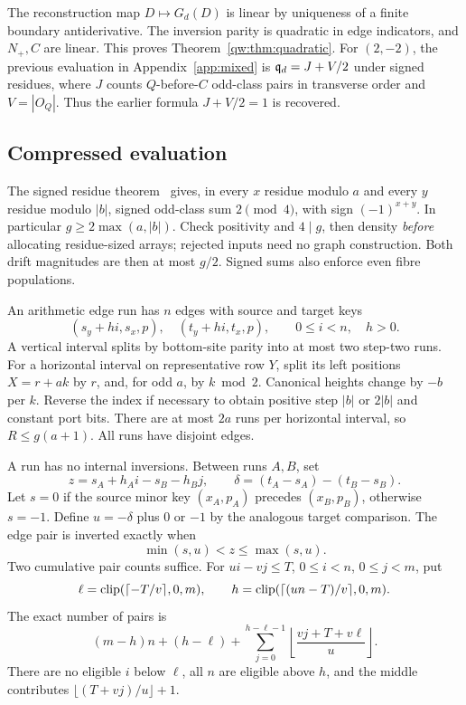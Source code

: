 The reconstruction map $D\mapsto G_d(D)$ is linear by uniqueness of a finite
boundary antiderivative. The inversion parity is quadratic in edge indicators,
and $N_+,C$ are linear. This proves Theorem~\ref{qw:thm:quadratic}.
For $(2,-2)$, the previous evaluation in Appendix~\ref{app:mixed} is
$\mathfrak q_d=J+V/2$ under signed residues, where $J$ counts $Q$-before-$C$ odd-class pairs
in transverse order and $V=|O_Q|$. Thus the earlier formula $J+V/2=1$ is recovered.

\subsection{Compressed evaluation}\label{qw:sec:algorithm}
The signed residue theorem~\cite[Section~7, ``Signed mod-four wake-residue identity'']{Jillhewar2026} gives, in every $x$ residue modulo $a$ and
every $y$ residue modulo $|b|$, signed odd-class sum $2\pmod4$, with sign
$(-1)^{x+y}$. In particular $g\ge2\max(a,|b|)$.
Check positivity and $4\mid g$, then density \emph{before} allocating residue-sized
arrays; rejected inputs need no graph construction. Both drift magnitudes are
then at most $g/2$. Signed sums also enforce even fibre populations.

An arithmetic edge run has $n$ edges with source and target keys
\begin{equation}
 (s_y+hi,s_x,p),\quad (t_y+hi,t_x,p),\qquad 0\le i<n,\quad h>0.
 \label{qw:eq:run}
\end{equation}
A vertical interval splits by bottom-site parity into at most two step-two runs.
For a horizontal interval on representative row $Y$, split its left positions
$X=r+ak$ by $r$, and, for odd $a$, by $k\bmod2$. Canonical heights change by
$-b$ per $k$. Reverse the index if necessary to obtain positive step $|b|$ or
$2|b|$ and constant port bits. There are at most $2a$ runs per horizontal interval,
so $R\le g(a+1)$. All runs have disjoint edges.

A run has no internal inversions. Between runs $A,B$, set
\[
 z=s_A+h_Ai-s_B-h_Bj,\qquad
 \delta=(t_A-s_A)-(t_B-s_B).
\]
Let $s=0$ if the source minor key $(x_A,p_A)$ precedes $(x_B,p_B)$, otherwise
$s=-1$. Define $u=-\delta$ plus $0$ or $-1$ by the analogous target comparison.
The edge pair is inverted exactly when
\begin{equation}
 \min(s,u)<z\le\max(s,u).\label{qw:eq:inversion-range}
\end{equation}
Two cumulative pair counts suffice. For
$ui-vj\le T$, $0\le i<n$, $0\le j<m$, put
\[
 \ell=\operatorname{clip}(\lceil-T/v\rceil,0,m),\qquad
 h=\operatorname{clip}(\lceil(un-T)/v\rceil,0,m).
\]
The exact number of pairs is
\begin{equation}
 (m-h)n+(h-\ell)+
 \sum_{j=0}^{h-\ell-1}\left\lfloor\frac{vj+T+v\ell}{u}\right\rfloor.
 \label{qw:eq:pairs}
\end{equation}
There are no eligible $i$ below $\ell$, all $n$ are eligible above $h$, and the
middle contributes $\lfloor(T+vj)/u\rfloor+1$.

